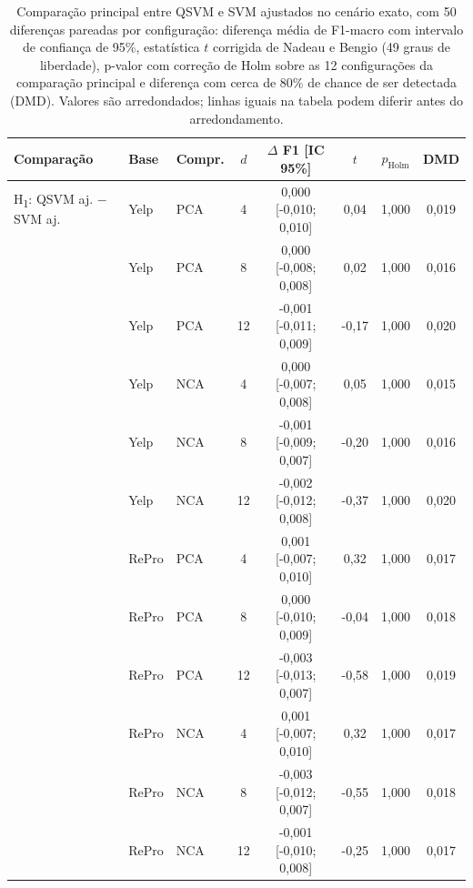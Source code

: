 \begin{table}[t]
\centering
\caption{Comparação principal entre QSVM e SVM ajustados no cenário exato, com 50 diferenças pareadas por configuração: diferença média de F1-macro com intervalo de confiança de 95\%, estatística $t$ corrigida de Nadeau e Bengio (49 graus de liberdade), p-valor com correção de Holm sobre as 12 configurações da comparação principal e diferença com cerca de 80\% de chance de ser detectada (DMD). Valores são arredondados; linhas iguais na tabela podem diferir antes do arredondamento.}
\label{tab:testes}
\footnotesize
\begin{tabular}{lllccccc}
\toprule
Comparação & Base & Compr. & $d$ & $\Delta$ F1 [IC 95\%] & $t$ & $p_{\mathrm{Holm}}$ & DMD \\
\midrule
H\textsubscript{1}: QSVM aj. $-$ SVM aj. & Yelp & PCA & 4 & 0,000 [-0,010; 0,010] & 0,04 & 1,000 & 0,019 \\
 & Yelp & PCA & 8 & 0,000 [-0,008; 0,008] & 0,02 & 1,000 & 0,016 \\
 & Yelp & PCA & 12 & -0,001 [-0,011; 0,009] & -0,17 & 1,000 & 0,020 \\
 & Yelp & NCA & 4 & 0,000 [-0,007; 0,008] & 0,05 & 1,000 & 0,015 \\
 & Yelp & NCA & 8 & -0,001 [-0,009; 0,007] & -0,20 & 1,000 & 0,016 \\
 & Yelp & NCA & 12 & -0,002 [-0,012; 0,008] & -0,37 & 1,000 & 0,020 \\
 & RePro & PCA & 4 & 0,001 [-0,007; 0,010] & 0,32 & 1,000 & 0,017 \\
 & RePro & PCA & 8 & 0,000 [-0,010; 0,009] & -0,04 & 1,000 & 0,018 \\
 & RePro & PCA & 12 & -0,003 [-0,013; 0,007] & -0,58 & 1,000 & 0,019 \\
 & RePro & NCA & 4 & 0,001 [-0,007; 0,010] & 0,32 & 1,000 & 0,017 \\
 & RePro & NCA & 8 & -0,003 [-0,012; 0,007] & -0,55 & 1,000 & 0,018 \\
 & RePro & NCA & 12 & -0,001 [-0,010; 0,008] & -0,25 & 1,000 & 0,017 \\
\bottomrule
\end{tabular}
\end{table}